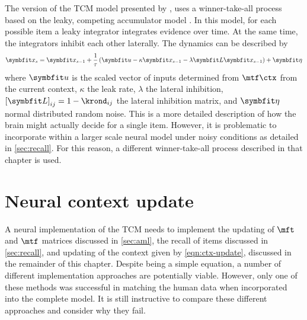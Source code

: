The version of the TCM model presented by \textcite{Sederberg2008}, uses a winner-take-all process based on the leaky, competing accumulator model \parencite{Usher2001}.
In this model, for each possible item a leaky integrator integrates evidence over time.
At the same time, the integrators inhibit each other laterally.
The dynamics can be described by
\begin{equation}
    \vc x_s = \vc x_{s - 1} + \frac{1}{\tau} \del{\vc u - \kappa \vc x_{s - 1} - \lambda \mat L \vc x_{s - 1}} + \vc\eta
\end{equation}
where $\vc u$ is the scaled vector of inputs determined from $\mtf \ctx$ from the current context, $\kappa$ the leak rate, $\lambda$ the lateral inhibition, ${[\mat L]}_{ij} = 1 - \krond_{ij}$ the lateral inhibition matrix, and $\vc\eta$ normal distributed random noise.
This is a more detailed description of how the brain might actually decide for a single item.
However, it is problematic to incorporate within a larger scale neural model under noisy conditions as detailed in \cref{sec:recall}.
For this reason, a different winner-take-all process described in that chapter is used.


\section{Neural context update}\label{sec:ctx-update}
A neural implementation of the TCM needs to implement the updating of $\mft$ and $\mtf$ matrices discussed in \cref{sec:aml}, the recall of items discussed in \cref{sec:recall}, and updating of the context given by \cref{eqn:ctx-update}, discussed in the remainder of this chapter.
Despite being a simple equation, a number of different implementation approaches are potentially viable.
However, only one of these methods was successful in matching the human data when incorporated into the complete model.
It is still instructive to compare these different approaches and consider why they fail.

